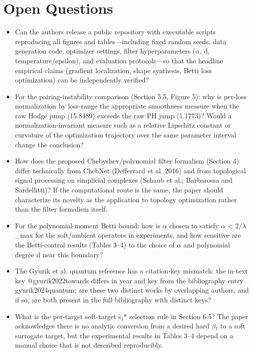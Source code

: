 \documentclass[11pt]{article}
\begin{document}
\section*{Open Questions}
\begin{itemize}[leftmargin=*]
  \item Can the authors release a public repository with executable scripts reproducing all figures and tables---including fixed random seeds, data generation code, optimizer settings, filter hyperparameters (\ensuremath{\alpha}, d, temperature/epsilon), and evaluation protocols---so that the headline empirical claims (gradient localization, shape synthesis, Betti loss optimization) can be independently verified?
  \item For the pairing-instability comparison (Section 5.5, Figure 5): why is per-loss normalization by loss-range the appropriate smoothness measure when the raw Hodge jump (15.8489) exceeds the raw PH jump (1.1773)? Would a normalization-invariant measure such as a relative Lipschitz constant or curvature of the optimization trajectory over the same parameter interval change the conclusion?
  \item How does the proposed Chebyshev/polynomial filter formalism (Section 4) differ technically from ChebNet (Defferrard et al. 2016) and from topological signal processing on simplicial complexes (Schaub et al.; Barbarossa and Sardellitti)? If the computational route is the same, the paper should characterize its novelty as the application to topology optimization rather than the filter formalism itself.
  \item For the polynomial-moment Betti bound: how is \ensuremath{\alpha} chosen to satisfy \ensuremath{\alpha} < 2/\ensuremath{\lambda}\_max for the soft/ambient operators in experiments, and how sensitive are the Betti-control results (Tables 3--4) to the choice of \ensuremath{\alpha} and polynomial degree d near this boundary?
  \item The Gyurik et al. quantum reference has a citation-key mismatch: the in-text key @gyurik2022towards differs in year and key from the bibliography entry gyurik2024quantum; are these two distinct works by overlapping authors, and if so, are both present in the full bibliography with distinct keys?
  \item What is the per-target soft-target s\={}₁* selection rule in Section 6.5? The paper acknowledges there is no analytic conversion from a desired hard \ensuremath{\beta}₁ to a soft surrogate target, but the experimental results in Tables 3--4 depend on a manual choice that is not described reproducibly.
\end{itemize}
\end{document}

